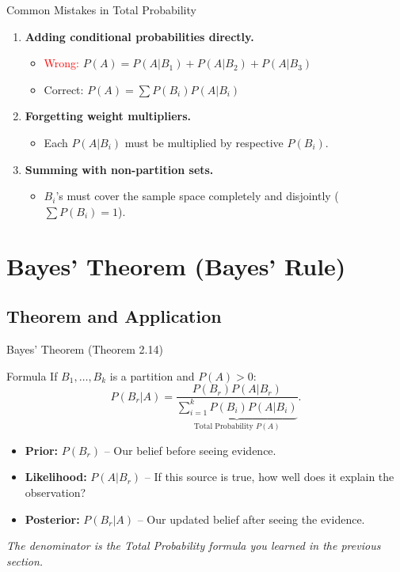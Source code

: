 \documentclass[light]{lutbeamer}
\begin{document}
\begin{frame}{Common Mistakes in Total Probability}
    \begin{enumerate}
        \item \textbf{Adding conditional probabilities directly.}
        \begin{itemize}
            \item \textcolor{red}{Wrong:} $P(A)=P(A|B_1)+P(A|B_2)+P(A|B_3)$
            \item \textcolor{green!60!black}{Correct:} $P(A)=\sum P(B_i)P(A|B_i)$
        \end{itemize}
        \item \textbf{Forgetting weight multipliers.}
        \begin{itemize}
            \item Each $P(A|B_i)$ must be multiplied by respective $P(B_i)$.
        \end{itemize}
        \item \textbf{Summing with non-partition sets.}
        \begin{itemize}
            \item $B_i$'s must cover the sample space completely and disjointly ($\sum P(B_i)=1$).
        \end{itemize}
    \end{enumerate}
\end{frame}

\section{Bayes' Theorem (Bayes' Rule)}
\subsection{Theorem and Application}

\begin{frame}[fragile]{Bayes' Theorem (Theorem 2.14)}
    \begin{block}{Formula}
        If \(B_1,\dots,B_k\) is a partition and \(P(A)>0\):
        \[
        P(B_r|A)
        =
        \frac{P(B_r)P(A|B_r)}
        {\underbrace{\sum_{i=1}^{k}P(B_i)P(A|B_i)}_{\text{Total Probability } P(A)}}.
        \]
    \end{block}

    \begin{itemize}
        \item \textbf{Prior:} \(P(B_r)\) -- Our belief before seeing evidence.
        \item \textbf{Likelihood:} \(P(A|B_r)\) -- If this source is true, how well does it explain the observation?
        \item \textbf{Posterior:} \(P(B_r|A)\) -- Our updated belief after seeing the evidence.
    \end{itemize}

    \vspace{0.15cm}
    \footnotesize
    \textit{The denominator is the Total Probability formula you learned in the previous section.}
\end{frame}
\end{document}
